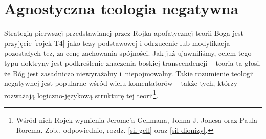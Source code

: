 

\section{Agnostyczna teologia negatywna}\label{roj-agnostycna}

Strategią pierwszej przedstawianej przez Rojka apofatycznej teorii Boga
jest przyjęcie \eqref{rojek-T4} jako tezy podstawowej i odrzucenie lub
modyfikacja pozostałych tez, za cenę zachowania spójności.
Jak już ujawniliśmy, celem tego typu doktryny jest podkreślenie znaczenia
boskiej transcendencji -- teoria ta głosi, że Bóg jest zasadniczo niewyrażalny
i~niepojmowalny. Takie rozumienie teologii negatywnej jest popularne wśród wielu
komentatorów -- także tych, którzy rozważają logiczno-językową strukturę
tej teorii\footnote{Wśród nich Rojek wymienia Jerome'a Gellmana, Johna J.
Jonesa oraz Paula Rorema. Zob., odpowiednio, rozdz. \ref{sil-gell} oraz \ref{sil-dionizy}.}.

